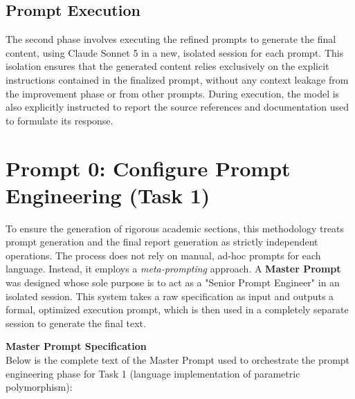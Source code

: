 \documentclass[11pt]{report}
\begin{document}
\subsection{Prompt Execution}
\label{AIPromptEngineering:Phases:PromptExecution}

The second phase involves executing the refined prompts to generate the
final content, using Claude Sonnet 5 in a new, isolated session for each
prompt. This isolation ensures that the generated content relies
exclusively on the explicit instructions contained in the finalized prompt,
without any context leakage from the improvement phase or from other
prompts. During execution, the model is also explicitly instructed to
report the source references and documentation used to formulate its
response.

\section{Prompt 0: Configure Prompt Engineering (Task 1)}
\label{Prompt 0 Task1}

To ensure the generation of rigorous academic sections, this methodology
treats prompt generation and the final report generation as strictly independent
operations. The process does not rely on manual, ad-hoc prompts for each
language. Instead, it employs a \textit{meta-prompting} approach. A
\textbf{Master Prompt} was designed whose sole purpose is to act as a
"Senior Prompt Engineer" in an isolated session. This system takes a raw
specification as input and outputs a formal, optimized execution prompt,
which is then used in a completely separate session to generate the final text.

\noindent\textbf{Master Prompt Specification} \\
Below is the complete text of the Master Prompt used to orchestrate
the prompt engineering phase for Task 1 (language implementation of parametric
polymorphism):
\end{document}
